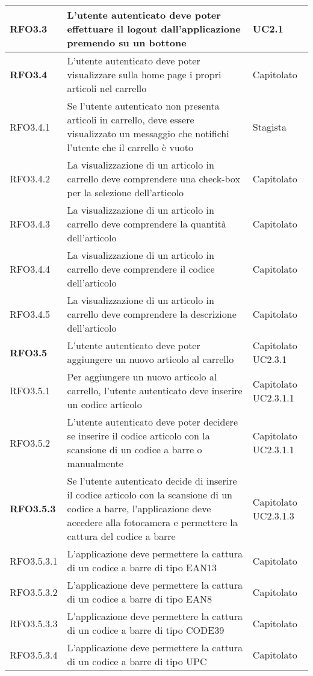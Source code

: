 {\begin{center}
\begin{longtable}{ | >{\centering\arraybackslash}p{2.5cm} | >{\arraybackslash}p{7cm} | >{\centering\arraybackslash}p{2cm} | }
RFO3.3 & L'utente autenticato deve poter effettuare il logout dall'applicazione premendo su un bottone & UC2.1 \\ \hline
\textbf{RFO3.4} & L'utente autenticato deve poter visualizzare sulla home page i propri articoli nel carrello & Capitolato \\ \hline
RFO3.4.1 & Se l'utente autenticato non presenta articoli in carrello, deve essere visualizzato un messaggio che notifichi l'utente che il carrello è vuoto & Stagista \\ \hline
RFO3.4.2 & La visualizzazione di un articolo in carrello deve comprendere una check-box per la selezione dell'articolo & Capitolato \\ \hline
RFO3.4.3 & La visualizzazione di un articolo in carrello deve comprendere la quantità dell'articolo & Capitolato \\ \hline
RFO3.4.4 & La visualizzazione di un articolo in carrello deve comprendere il codice dell'articolo & Capitolato \\ \hline
RFO3.4.5 & La visualizzazione di un articolo in carrello deve comprendere la descrizione dell'articolo & Capitolato \\ \hline
\textbf{RFO3.5} & L'utente autenticato deve poter aggiungere un nuovo articolo al carrello & Capitolato UC2.3.1 \\ \hline
RFO3.5.1 & Per aggiungere un nuovo articolo al carrello, l'utente autenticato deve inserire un codice articolo & Capitolato UC2.3.1.1 \\ \hline
RFO3.5.2 & L'utente autenticato deve poter decidere se inserire il codice articolo con la scansione di un codice a barre o manualmente & Capitolato UC2.3.1.1 \\ \hline
\textbf{RFO3.5.3} & Se l'utente autenticato decide di inserire il codice articolo con la scansione di un codice a barre, l'applicazione deve accedere alla fotocamera e permettere la cattura del codice a barre & Capitolato UC2.3.1.3 \\ \hline
RFO3.5.3.1 & L'applicazione deve permettere la cattura di un codice a barre di tipo EAN13 & Capitolato \\ \hline
RFO3.5.3.2 & L'applicazione deve permettere la cattura di un codice a barre di tipo EAN8 & Capitolato \\ \hline
RFO3.5.3.3 & L'applicazione deve permettere la cattura di un codice a barre di tipo CODE39 & Capitolato \\ \hline
RFO3.5.3.4 & L'applicazione deve permettere la cattura di un codice a barre di tipo UPC & Capitolato \\ \hline

\end{longtable}
\end{center}}
